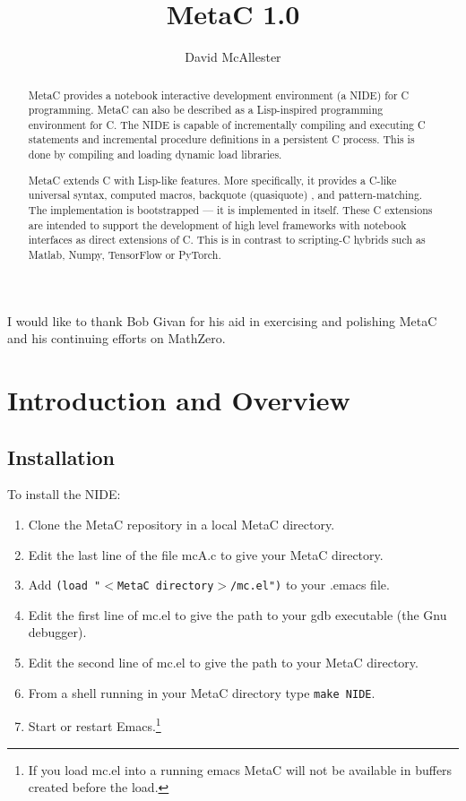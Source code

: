 \documentclass{article}
\title{MetaC 1.0}
\author{David McAllester}
\begin{document}
\maketitle

\begin{abstract}
  MetaC provides a notebook interactive development environment (a NIDE) for C programming.
  MetaC can also be described as a Lisp-inspired programming environment for C.
  The NIDE is capable of incrementally compiling and executing
  C statements and incremental procedure definitions in a persistent C process.
  This is done by compiling and loading dynamic load libraries.

  MetaC extends C with Lisp-like features. More specifically, it provides a C-like universal syntax,
  computed macros, backquote (quasiquote) \cite{backquote}, and pattern-matching.
  The implementation is bootstrapped --- it is implemented in itself.  These C extensions are intended to support the development of high level
  frameworks with notebook interfaces as direct extensions of C.  This is in contrast to scripting-C hybrids such as Matlab, Numpy, TensorFlow or PyTorch.
\end{abstract}

\vfill
{}  I would like to thank Bob Givan for his aid in exercising and polishing MetaC and his continuing efforts on MathZero.
\newpage

\tableofcontents

\newpage

\section{Introduction and Overview}

\subsection{Installation}

\noindent To install the NIDE:

\begin{enumerate}
\item Clone the MetaC repository in a local MetaC directory.
\item Edit the last line of the file mcA.c to give your MetaC directory.
\item Add {\tt (load "$<$MetaC directory$>$/mc.el")} to your .emacs file.
\item Edit the first line of  mc.el to give the path to your gdb executable (the Gnu debugger).
\item Edit the second line of mc.el to give the path to your MetaC directory.
\item From a shell running in your MetaC directory type {\tt make NIDE}.
\item Start or restart Emacs.\footnote{If you load mc.el into a running emacs
MetaC will not be available in buffers created before the load.}
\end{enumerate}
\end{document}
